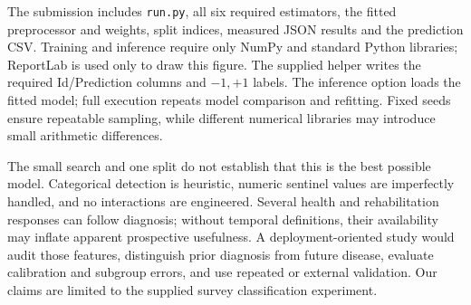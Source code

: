 \documentclass[10pt,conference,compsocconf]{IEEEtran}
\begin{document}
The submission includes \texttt{run.py}, all six required estimators, the fitted preprocessor and weights, split indices, measured JSON results and the prediction CSV. Training and inference require only NumPy and standard Python libraries; ReportLab is used only to draw this figure. The supplied helper writes the required Id/Prediction columns and $-1,+1$ labels. The inference option loads the fitted model; full execution repeats model comparison and refitting. Fixed seeds ensure repeatable sampling, while different numerical libraries may introduce small arithmetic differences.

The small search and one split do not establish that this is the best possible model. Categorical detection is heuristic, numeric sentinel values are imperfectly handled, and no interactions are engineered. Several health and rehabilitation responses can follow diagnosis; without temporal definitions, their availability may inflate apparent prospective usefulness. A deployment-oriented study would audit those features, distinguish prior diagnosis from future disease, evaluate calibration and subgroup errors, and use repeated or external validation. Our claims are limited to the supplied survey classification experiment.
\end{document}
